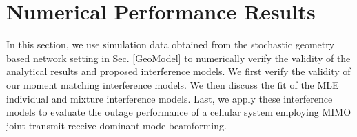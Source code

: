 \documentclass[12pt, draftclsnofoot, onecolumn]{IEEEtran}
\theoremstyle{plain}
\begin{document}
\section{Numerical Performance Results}\label{results}
\vspace{-0.05in}
\iffalse
\begin{figure*}[t!]
    \centering
    \begin{subfigure}[t]{0.45\textwidth}
        \centering
        \texttt{[image: Cor\_S09\_A234\_P30\_real]}
        \DeclareGraphicsExtensions{.eps}
        \vspace{-0.15in}
        \caption{{\small PDF $\left( \sigma_{SF}=\{0, 9\}\text{, and }\alpha=\{2, 3, 4\} \right)$.}} 
        \label{corA2}
    \end{subfigure}%
    ~ 
    \begin{subfigure}[t]{0.45\textwidth}
        \centering
        \texttt{[image: Correlation\_Probability\_v2]}
        \DeclareGraphicsExtensions{.eps}
        \vspace{-0.15in}
        \caption{{\small Probability of weak correlation.}}
        \label{corA2_b}
    \end{subfigure}\vspace{-0.41in}
    \caption{The real component of the correlation between interference at two different receiving antenna elements, $P_{max}=30 \text{dBm } $.} \label{corA2_super}
	\vspace{-0.45in}
	\vspace{-.2in}
\end{figure*}
\fi
In this section, we use simulation data obtained from the stochastic geometry based network setting in Sec. \ref{GeoModel} to numerically verify the validity of the analytical results and proposed interference models. We first verify the validity of our moment matching interference models. We then discuss the fit of the MLE individual and mixture interference models. Last, we apply these interference models to evaluate the outage performance of a cellular system employing MIMO joint transmit-receive dominant mode beamforming. 
\end{document}
